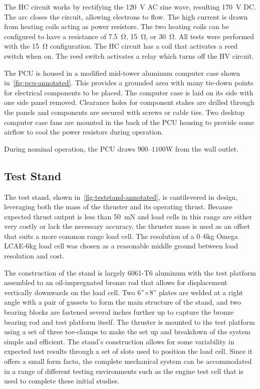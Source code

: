 \documentclass[journal]{IEEEtran}
\begin{document}
The HC circuit works by rectifying the \SI{120}{\volt} AC sine wave, resulting \SI{170}{\volt} DC.\@
The arc closes the circuit, allowing electrons to flow.
The high current is drawn from heating coils acting as power resistors.
The two heating coils can be configured to have a resistance of \SI{7.5}{\ohm}, \SI{15}{\ohm}, or \SI{30}{\ohm}.
All tests were performed with the \SI{15}{\ohm} configuration.
The HC circuit has a coil that activates a reed switch when on.
The reed switch activates a relay which turns off the HV circuit.

The PCU is housed in a modified mid-tower aluminum computer case shown in~\autoref{fig:pcu-annotated}.
This provides a grounded area with many tie-down points for electrical components to be placed.
The computer case is laid on its side with one side panel removed.
Clearance holes for component stakes are drilled through the panels and components are secured with screws or cable ties.
Two desktop computer case fans are mounted in the back of the PCU housing to provide some airflow to cool the power resistors during operation.

During nominal operation, the PCU draws $900$--$1100$\si{\watt} from the wall outlet.

\subsection{Test Stand}
The test stand, shown in~\autoref{fig:teststand-annotated}, is cantilevered in design, leveraging both the mass of the thruster and its operating thrust.
Because expected thrust output is less than \SI{50}{\milli\newton} and load cells in this range are either very costly or lack {\color{red}the necessary accuracy}, the thruster mass is used as an offset that suits a more common range load cell.
The resolution of a 0--6\si{\kilo\gram} Omega LCAE-6kg load cell was chosen as a reasonable middle ground between load resolution and cost.

The construction of the stand is largely 6061-T6 aluminum with the test platform assembled to an oil-impregnated bronze rod that allows for displacement vertically downwards on the load cell.
Two 6''$\times$8'' plates are welded at a right angle with a pair of gussets to form the main structure of the stand, and two bearing blocks are fastened several inches further up to capture the bronze bearing rod and test platform itself.
The thruster is mounted to the test platform using a set of three toe-clamps to make the set up and breakdown of the system simple and efficient.
The stand's construction allows for some variability in expected test results through a set of slots used to position the load cell. Since it offers a small form facto, the complete mechanical system can be accommodated in a range of different testing environments such as the engine test cell that is used to complete these initial studies.
\end{document}
